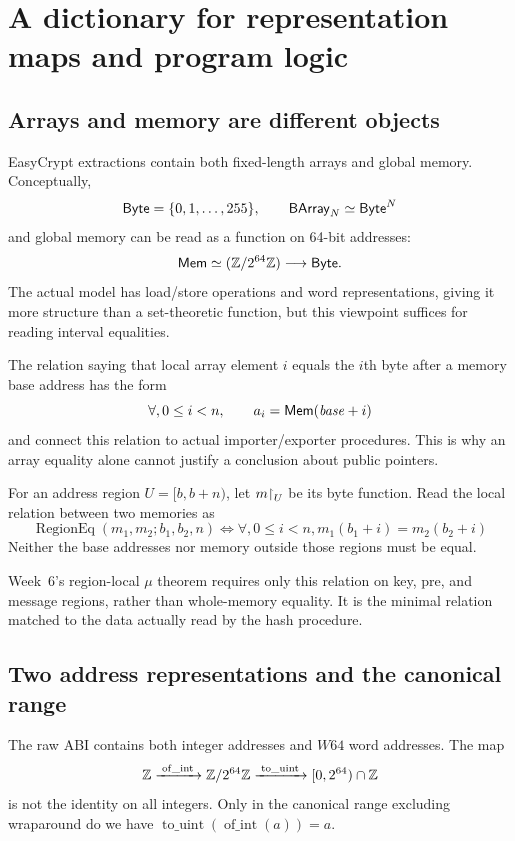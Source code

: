\section{A dictionary for representation maps and program logic}
\label{sec:representation-logic}

\subsection{Arrays and memory are different objects}

EasyCrypt extractions contain both fixed-length arrays and global memory.
Conceptually,
\[
  \mathsf{Byte}=\{0,1,\ldots,255\},\qquad
  \mathsf{BArray}_N\simeq\mathsf{Byte}^N
\]
and global memory can be read as a function on 64-bit addresses:
\[
  \mathsf{Mem}\simeq (\mathbb{Z}/2^{64}\mathbb{Z})\longrightarrow\mathsf{Byte}.
\]
The actual model has load/store operations and word representations, giving
it more structure than a set-theoretic function, but this viewpoint suffices
for reading interval equalities.

The relation saying that local array element \(i\) equals the \(i\)th byte
after a memory base address has the form
\[
  \forall,0\le i<n,\qquad
  a_i=\mathsf{Mem}(\mathit{base}+i)
\]
 and 
connect this relation to actual importer/exporter procedures. This is why an
array equality alone cannot justify a conclusion about public pointers.

\begin{definition}
For an address region \(U=[b,b+n)\), let \(m\mathord{\upharpoonright}_U\) be its byte function.
Read the local relation between two memories as
\[
  \operatorname{RegionEq}(m_1,m_2;b_1,b_2,n)
  \Longleftrightarrow
  \forall,0\le i<n,
  m_1(b_1+i)=m_2(b_2+i)
\]
Neither the base addresses nor memory outside those regions must be equal.
\end{definition}

Week~6's region-local \(\mu\) theorem requires only this relation on key,
pre, and message regions, rather than whole-memory equality.
It is the minimal relation matched to the data actually read by the hash procedure.

\subsection{Two address representations and the canonical range}

The raw ABI contains both integer addresses and \(W64\) word addresses.
The map
\[
  \mathbb{Z}\xrightarrow{\;\operatorname{of\_int}\;}\mathbb{Z}/2^{64}\mathbb{Z}
  \xrightarrow{\;\operatorname{to\_uint}\;}[0,2^{64})\cap\mathbb{Z}
\]
is not the identity on all integers.
Only in the canonical range excluding wraparound do we have
\(\operatorname{to\_uint}(\operatorname{of\_int}(a))=a\).


